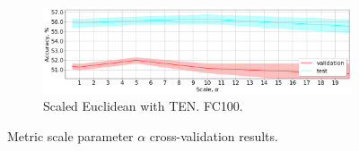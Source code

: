 \documentclass{article}
\begin{document}
\begin{figure}[t]
    \begin{subfigure}[t]{0.49\textwidth}
        \includegraphics[width=\textwidth]{scale_crossvalidation_cbn_CIFAR100.png}
        \caption{Scaled Euclidean with TEN. FC100.}
        \label{fig:scaled_euclidean_with_tbn_cifar100}
    \end{subfigure}
    \caption{Metric scale parameter $\alpha$ cross-validation results.}
    \label{fig:metric_scaling}
\end{figure}



\end{document}
